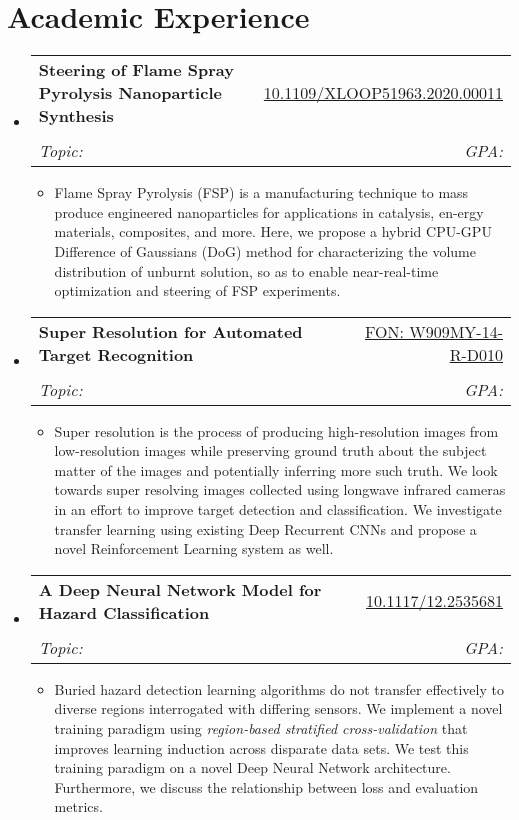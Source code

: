 \documentclass[letterpaper,11pt]{article}
\makeatletter
\newcommand{\resumeSubheading}[6]{
  \vspace{-1pt}\item
    \begin{tabular*}{0.97\textwidth}{l@{\extracolsep{\fill}}r}
      \textbf{#1} & #2
      \ifthenelse{\equal{#3}{}}{}{
        \\ \textit{\small#3} & \textit{\small #4}
      } 
      \ifthenelse{\equal{#5}{}}{}{
        \\ \textit{\small Topic: #5}
      }
      \ifthenelse{\equal{#6}{}}{}{
         & \textit{\small GPA: #6}
      }
    \end{tabular*}\vspace{-5pt}
}
\newcommand{\resumeSubHeadingListStart}{\begin{itemize}[leftmargin=*]}
\newcommand{\resumeSubHeadingListEnd}{\end{itemize}}
\newcommand{\resumeItemListStart}{\begin{itemize}}
\newcommand{\resumeItemListEnd}{\end{itemize}\vspace{-5pt}}
\makeatother
\begin{document}
\section{Academic Experience}
  \resumeSubHeadingListStart
    \resumeSubheading
      {Steering of Flame Spray Pyrolysis Nanoparticle Synthesis}{\href{https://conferences.computer.org/scwpub/pdfs/XLOOP2020-78HhbO4BRAvWFG2azrH595/107200a035/107200a035.pdf}{10.1109/XLOOP51963.2020.00011}}
      {}{}{}{}
      \resumeItemListStart
        \item[] \small{
          Flame Spray Pyrolysis (FSP) is a manufacturing technique to mass produce engineered nanoparticles for applications in catalysis, en-ergy materials, composites, and more. 
          Here, we propose a hybrid CPU-GPU Difference of Gaussians (DoG) method for characterizing the volume distribution of unburnt solution, so as to enable near-real-time optimization and steering of FSP experiments. 
        }
      \resumeItemListEnd
    \resumeSubheading
      {Super Resolution for Automated Target Recognition}{\href{https://www.afcea.org/event/sites/default/files/files/CERDEC Army Industry Day Slides.pdf}{FON: W909MY-14-R-D010}}
      {}{}{}{}
      \resumeItemListStart
        \item[] \small{
          Super resolution is the process of producing high-resolution images from low-resolution images while preserving ground truth about the subject matter of the images and potentially inferring more such truth. 
          We look towards super resolving images collected using longwave infrared cameras in an effort to improve target detection and classification. 
          We investigate transfer learning using existing Deep Recurrent CNNs and propose a novel Reinforcement Learning system as well.
        }
      \resumeItemListEnd
    \resumeSubheading
      {A Deep Neural Network Model for Hazard Classification}{\href{https://doi.org/10.1117/12.2535681}{10.1117/12.2535681}}
      {}{}{}{}
      \resumeItemListStart
        \item[] \small{ 
          Buried hazard detection learning algorithms do not transfer effectively to diverse regions interrogated with differing sensors. We implement a novel training paradigm using \textit{region-based stratified cross-validation} that improves learning induction across disparate data sets. 
          We test this training paradigm on a novel Deep Neural Network architecture. Furthermore, we discuss the relationship between loss and evaluation metrics.
        }
      \resumeItemListEnd
    \resumeSubHeadingListEnd
\end{document}
